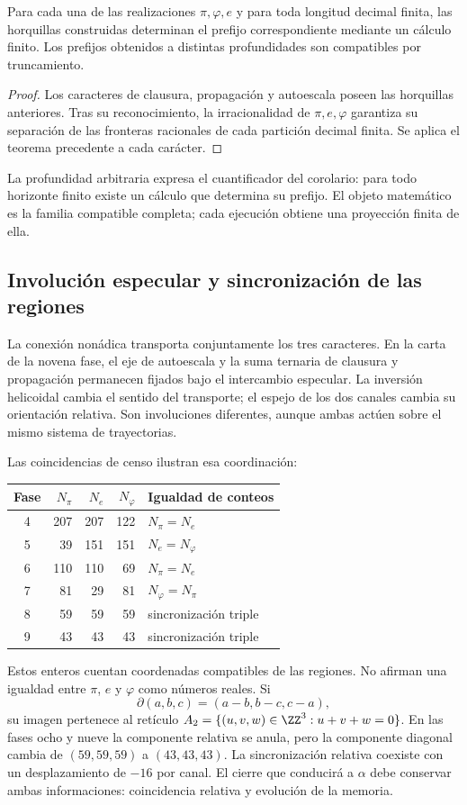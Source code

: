 \begin{corollary}
\label{x_reciprocidad:gen:prefijos-regionales}
Para cada una de las realizaciones \(\pi,\varphi,e\) y para toda longitud
decimal finita, las horquillas construidas determinan el prefijo correspondiente
mediante un cálculo finito. Los prefijos obtenidos a distintas profundidades
son compatibles por truncamiento.
\end{corollary}
\begin{proof}
Los caracteres de clausura, propagación y autoescala poseen las horquillas
anteriores. Tras su reconocimiento, la irracionalidad de \(\pi,e,\varphi\)
garantiza su separación de las fronteras racionales de cada partición decimal
finita. Se aplica el teorema precedente a cada carácter.
\end{proof}
La profundidad arbitraria expresa el cuantificador del corolario: para todo
horizonte finito existe un cálculo que determina su prefijo. El objeto
matemático es la familia compatible completa; cada ejecución obtiene una
proyección finita de ella.

\subsection{Involución especular y sincronización de las regiones}

La conexión nonádica transporta conjuntamente los tres caracteres. En la carta de la novena fase, el eje de autoescala y la suma ternaria de clausura y propagación permanecen fijados bajo el intercambio especular. La inversión helicoidal cambia el sentido del transporte; el espejo de los dos canales cambia su orientación relativa. Son involuciones diferentes, aunque ambas actúen sobre el mismo sistema de trayectorias.

Las coincidencias de censo ilustran esa coordinación:
\begin{center}
\begin{tabular}{@{}c rrr l@{}}\toprule
Fase&\(N_\pi\)&\(N_e\)&\(N_\varphi\)&Igualdad de conteos\\\midrule
4&207&207&122&\(N_\pi=N_e\)\\
5&39&151&151&\(N_e=N_\varphi\)\\
6&110&110&69&\(N_\pi=N_e\)\\
7&81&29&81&\(N_\varphi=N_\pi\)\\
8&59&59&59&sincronización triple\\
9&43&43&43&sincronización triple\\\bottomrule
\end{tabular}
\end{center}
Estos enteros cuentan coordenadas compatibles de las regiones. No afirman una igualdad entre \(\pi\), \(e\) y \(\varphi\) como números reales. Si
\[
 \partial(a,b,c)=(a-b,b-c,c-a),
\]
su imagen pertenece al retículo \(A_2=\{(u,v,w)\in\ZZ^3:u+v+w=0\}\). En las fases ocho y nueve la componente relativa se anula, pero la componente diagonal cambia de \((59,59,59)\) a \((43,43,43)\). La sincronización relativa coexiste con un desplazamiento de \(-16\) por canal. El cierre que conducirá a \(\alpha\) debe conservar ambas informaciones: coincidencia relativa y evolución de la memoria.

